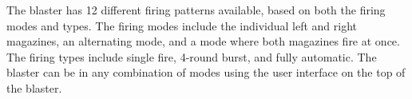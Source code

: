 The blaster has 12 different firing patterns available, based on both the firing modes and types. The firing modes include the individual left and right magazines, an alternating mode, and a mode where both magazines fire at once. The firing types include single fire, 4-\/round burst, and fully automatic. The blaster can be in any combination of modes using the user interface on the top of the blaster. 